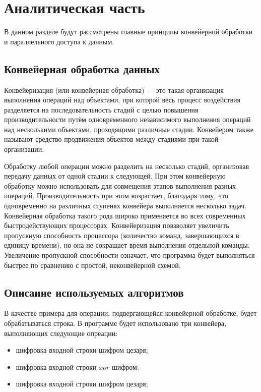 \chapter{Аналитическая часть}

В данном разделе будут рассмотрены главные принципы конвейерной обработки и параллельного доступа к данным.

\section{Конвейерная обработка данных}
Конвейеризация (или конвейерная обработка) --- это такая организация выполнения операций над объектами, при которой весь процесс воздействия разделяется на последовательность стадий с целью повышения производительности путём одновременного независимого выполнения операций над несколькими объектами, проходящими различные стадии. Конвейером также называют средство продвижения объектов между стадиями при такой организации.

Обработку любой операции можно разделить на
несколько стадий, организовав передачу данных от одной стадии к следующей. При этом конвейерную обработку можно использовать для совмещения этапов выполнения разных операций. Производительность при этом возрастает, благодаря тому, что одновременно на различных
ступенях конвейера выполняется несколько задач. Конвейерная обработка
такого рода широко применяется во всех современных быстродействующих
процессорах.
Конвейеризация повзволяет увеличить пропускную способность процессора (количество команд, завершающихся в единицу времени), но она не сокращает время выполнения отдельной команды. Увеличение пропускной способности означает, что программа будет выполняться
быстрее по сравнению с простой, неконвейерной схемой.

\section{Описание используемых алгоритмов}
В качестве примера для операции, подвергающейся конвейерной обработке, будет обрабатываться строка. 
В программе будет использовано три конвейера, выполняющих следующие опреации:
\begin{itemize}
	\item шифровка входной строки шифром цезаря;
\item шифровка входной строки $xor$ шифром;
\item шифровка входной строки шифром цезаря;
\end{itemize} 

